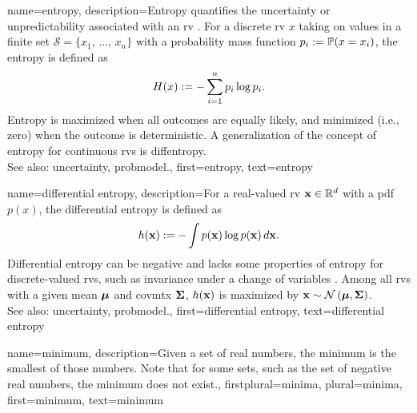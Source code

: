{name={entropy},
	description={Entropy quantifies the \gls{uncertainty} or unpredictability 
		associated with an \gls{rv} \cite{coverthomas}. For a discrete \gls{rv} $x$ taking on values 
		in a finite set $\mathcal{S} = \{x_1, \,\ldots, \,x_n\}$ with a \gls{probability} mass 
		\gls{function} $p_i := \mathbb{P}({x = x_i})$, the entropy is defined as
		\[
		H(x) := -\sum_{i=1}^n p_i \log p_i.
		\]
		Entropy is maximized when all outcomes are equally likely, and minimized (i.e., zero) 
		when the outcome is deterministic. A \gls{generalization} of the concept of entropy for continuous 
		\glspl{rv} is \gls{diffentropy}. 
		\\
		See also: \gls{uncertainty}, \gls{probmodel}.},
	first={entropy},
	text={entropy}
}

{name={differential entropy},
	description={For a real-valued \gls{rv} ${\bf x} \in \mathbb{R}^{d}$ 
		with a \gls{pdf} $p(x)$, the differential \gls{entropy} is defined as \cite{coverthomas}
		\[
		h({\bf x}) := - \int p({\bf x}) \log p({\bf x}) \, d{\bf x}.
		\]
		Differential \gls{entropy} can be negative and lacks some properties of \gls{entropy} for 
		discrete-valued \glspl{rv}, such as invariance under a change of variables \cite{coverthomas}. 
		Among all \glspl{rv} with a given \gls{mean} ${\bm \mu}$ and \gls{covmtx} ${\bf \Sigma}$, 
		$h({\bf x})$ is maximized by ${\bf x} \sim \mathcal{N}\left({\bm \mu},{\bf \Sigma}\right)$. 
		\\
		See also: \gls{uncertainty}, \gls{probmodel}.},
	first={differential entropy},
	text={differential entropy}
}

{name={minimum},
	description={Given a set of real numbers, the minimum is the smallest of those numbers.
		Note that for some sets, such as the set of negative real numbers, the minimum does not exist.},
	firstplural={minima}, 
 	plural={minima},
	first={minimum},
	text={minimum}
}

